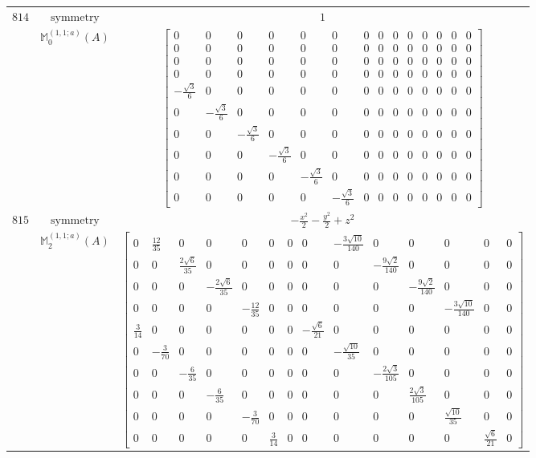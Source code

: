 \documentclass[fleqn,8pt,landscape]{jsarticle}
\begin{document}
\begin{longtable}{ccc}
$ 814 $ & $ \text{symmetry} $ & $ 1 $ \\
$  $ & $ \mathbb{M}_{0}^{(1,1;a)}(A) $ & $ \begin{bmatrix} 0 & 0 & 0 & 0 & 0 & 0 & 0 & 0 & 0 & 0 & 0 & 0 & 0 & 0 \\ 0 & 0 & 0 & 0 & 0 & 0 & 0 & 0 & 0 & 0 & 0 & 0 & 0 & 0 \\ 0 & 0 & 0 & 0 & 0 & 0 & 0 & 0 & 0 & 0 & 0 & 0 & 0 & 0 \\ 0 & 0 & 0 & 0 & 0 & 0 & 0 & 0 & 0 & 0 & 0 & 0 & 0 & 0 \\ - \frac{\sqrt{3}}{6} & 0 & 0 & 0 & 0 & 0 & 0 & 0 & 0 & 0 & 0 & 0 & 0 & 0 \\ 0 & - \frac{\sqrt{3}}{6} & 0 & 0 & 0 & 0 & 0 & 0 & 0 & 0 & 0 & 0 & 0 & 0 \\ 0 & 0 & - \frac{\sqrt{3}}{6} & 0 & 0 & 0 & 0 & 0 & 0 & 0 & 0 & 0 & 0 & 0 \\ 0 & 0 & 0 & - \frac{\sqrt{3}}{6} & 0 & 0 & 0 & 0 & 0 & 0 & 0 & 0 & 0 & 0 \\ 0 & 0 & 0 & 0 & - \frac{\sqrt{3}}{6} & 0 & 0 & 0 & 0 & 0 & 0 & 0 & 0 & 0 \\ 0 & 0 & 0 & 0 & 0 & - \frac{\sqrt{3}}{6} & 0 & 0 & 0 & 0 & 0 & 0 & 0 & 0 \end{bmatrix} $ \\ \hline
$ 815 $ & $ \text{symmetry} $ & $ - \frac{x^{2}}{2} - \frac{y^{2}}{2} + z^{2} $ \\
$  $ & $ \mathbb{M}_{2}^{(1,1;a)}(A) $ & $ \begin{bmatrix} 0 & \frac{12}{35} & 0 & 0 & 0 & 0 & 0 & 0 & - \frac{3 \sqrt{10}}{140} & 0 & 0 & 0 & 0 & 0 \\ 0 & 0 & \frac{2 \sqrt{6}}{35} & 0 & 0 & 0 & 0 & 0 & 0 & - \frac{9 \sqrt{2}}{140} & 0 & 0 & 0 & 0 \\ 0 & 0 & 0 & - \frac{2 \sqrt{6}}{35} & 0 & 0 & 0 & 0 & 0 & 0 & - \frac{9 \sqrt{2}}{140} & 0 & 0 & 0 \\ 0 & 0 & 0 & 0 & - \frac{12}{35} & 0 & 0 & 0 & 0 & 0 & 0 & - \frac{3 \sqrt{10}}{140} & 0 & 0 \\ \frac{3}{14} & 0 & 0 & 0 & 0 & 0 & 0 & - \frac{\sqrt{6}}{21} & 0 & 0 & 0 & 0 & 0 & 0 \\ 0 & - \frac{3}{70} & 0 & 0 & 0 & 0 & 0 & 0 & - \frac{\sqrt{10}}{35} & 0 & 0 & 0 & 0 & 0 \\ 0 & 0 & - \frac{6}{35} & 0 & 0 & 0 & 0 & 0 & 0 & - \frac{2 \sqrt{3}}{105} & 0 & 0 & 0 & 0 \\ 0 & 0 & 0 & - \frac{6}{35} & 0 & 0 & 0 & 0 & 0 & 0 & \frac{2 \sqrt{3}}{105} & 0 & 0 & 0 \\ 0 & 0 & 0 & 0 & - \frac{3}{70} & 0 & 0 & 0 & 0 & 0 & 0 & \frac{\sqrt{10}}{35} & 0 & 0 \\ 0 & 0 & 0 & 0 & 0 & \frac{3}{14} & 0 & 0 & 0 & 0 & 0 & 0 & \frac{\sqrt{6}}{21} & 0 \end{bmatrix} $ \\ \hline

\end{longtable}
\end{document}
